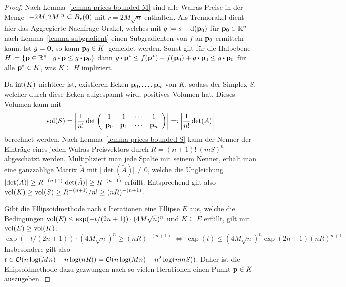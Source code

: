 \begin{proof}
	Nach Lemma~\ref{lemma-prices-bounded-M} sind alle Walras-Preise in der Menge $[-2M, 2M]^n\subseteq B_{r}(\mathbf{0})$ mit $r = 2M\sqrt{n}$ enthalten.
	Als Trennorakel dient hier das Aggregierte-Nachfrage-Orakel, welches mit $g \coloneqq s - \operatorname{d}(\mathbf{p}_0)$ für $\mathbf{p}_0\in\mathbb{R}^n$ nach Lemma~\ref{lemma-subgradient} einen Subgradienten von $f$ an $\mathbf{p}_0$ ermitteln kann.
	Ist $g = \mathbf{0}$, so kann \glqq$\mathbf{p}_0 \in K$\grqq\ gemeldet werden.
	Sonst gilt für die Halbebene $H\coloneqq\{ \fp\in\R^n \mid g\bcdot \fp \leq g\bcdot \fp_0 \}$ dann $g\bcdot \fp^* \leq f(\fp^*) - f(\fp_0) + g \bcdot \fp_0 \leq g \bcdot \fp_0$ für alle $\mathbf{p}^*\in K$, was $K\subseteq H$ impliziert.
	
	Da $\operatorname{int}(K)$ nichtleer ist, existieren Ecken $\mathbf{p}_0, \dots, \mathbf{p}_n$ von $K$, sodass der Simplex $S$, welcher durch diese Ecken aufgespannt wird, positives Volumen hat.
	Dieses Volumen kann mit
	\[ \operatorname{vol}(S) = \left\lvert  \frac{1}{n!} \det\left(  \begin{array}{ccccc}
		1 & 1 & \cdots & 1 \\	
		\mathbf{p}_0 & \mathbf{p}_1 & \cdots & \mathbf{p}_n
	\end{array}  \right) \right\rvert  \eqqcolon \left\lvert  \frac{1}{n!} \det(A)  \right\rvert \]
	berechnet werden.
	Nach Lemma~\ref{lemma-prices-bounded-S} kann der Nenner der Einträge eines jeden Walras-Preisvektors durch $R = (n+1)!\ (mS)^n$ abgeschätzt werden.
	Multipliziert man jede Spalte mit seinem Nenner,
	erhält man eine ganzzahlige Matrix $\tilde{A}$ mit $\lvert \det(\tilde{A}) \rvert \neq 0$,
	welche die Ungleichung $\left\lvert  \det(A)  \right\rvert \geq R^{-(n+1)} \lvert \det(\tilde{A}) \rvert \geq R^{-(n+1)}$ erfüllt.
	Entsprechend gilt also $\operatorname{vol}(K) \geq \operatorname{vol}(S) \geq R^{-(n+1)} / n! \geq (nR)^{-(n+1)}$.
	
	Gibt die Ellipsoidmethode nach $t$ Iterationen eine Ellipse $E$ aus, welche die Bedingungen $\operatorname{vol}(E) \leq \operatorname{exp}(-t / ({2n + 1}))\cdot (4M \sqrt{n})^n$ und $K\subseteq E$ erfüllt, gilt mit $\operatorname{vol}(E) \geq \operatorname{vol}(K)$:
	\[ \exp(-t / ({2n + 1}))\cdot (4M\sqrt{n})^n \geq (nR)^{-(n+1)}
	~ \Leftrightarrow ~ \exp(t) \leq (4M\sqrt{n})^n \exp(2n+1) (nR)^{n+1} \]
	Insbesondere gilt also $t\in\mathcal{O}(n\log(Mn) + n\log(nR)) = \mathcal{O}(n\log(Mn) + n^2 \log(n m S))$.
	Daher ist die Ellipsoidmethode dazu gezwungen nach so vielen Iterationen einen Punkt $\mathbf{p}\in K$ auszugeben.
\end{proof}

